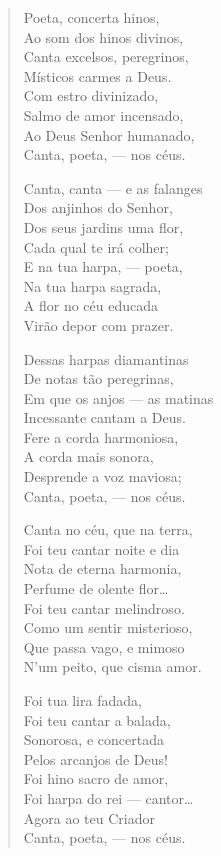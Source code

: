 \begin{verse}
Poeta, concerta hinos,\\
Ao som dos hinos divinos,\\
Canta excelsos, peregrinos,\\
Místicos carmes a Deus.\\
Com estro divinizado,\\
Salmo de amor incensado,\\
Ao Deus Senhor humanado,\\
Canta, poeta, --- nos céus.

Canta, canta --- e as falanges\\
Dos anjinhos do Senhor,\\
Dos seus jardins uma flor,\\
Cada qual te irá colher;\\
E na tua harpa, --- poeta,\\
Na tua harpa sagrada,\\
A flor no céu educada\\
Virão depor com prazer.

Dessas harpas diamantinas\\
De notas tão peregrinas,\\
Em que os anjos --- as matinas\\
Incessante cantam a Deus.\\
Fere a corda harmoniosa,\\
A corda mais sonora,\\
Desprende a voz maviosa;\\
Canta, poeta, --- nos céus.

Canta no céu, que na terra,\\
Foi teu cantar noite e dia\\
Nota de eterna harmonia,\\
Perfume de olente flor\ldots{}\\
Foi teu cantar melindroso.\\
Como um sentir misterioso,\\
Que passa vago, e mimoso\\
N'um peito, que cisma amor.

Foi tua lira fadada,\\
Foi teu cantar a balada,\\
Sonorosa, e concertada\\
Pelos arcanjos de Deus!\\
Foi hino sacro de amor,\\
Foi harpa do rei --- cantor\ldots{}\\
Agora ao teu Criador\\
Canta, poeta, --- nos céus.
\end{verse}

